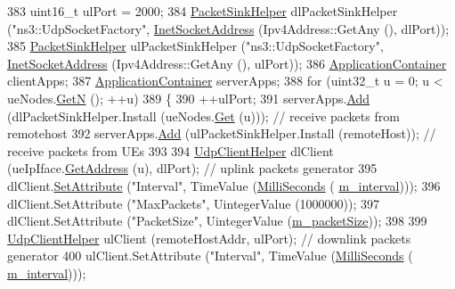 \begin{DoxyCode}
383   uint16\_t ulPort = 2000;
384   \hyperlink{classns3_1_1PacketSinkHelper}{PacketSinkHelper} dlPacketSinkHelper (\textcolor{stringliteral}{"ns3::UdpSocketFactory"}, 
      \hyperlink{classns3_1_1InetSocketAddress}{InetSocketAddress} (Ipv4Address::GetAny (), dlPort));
385   \hyperlink{classns3_1_1PacketSinkHelper}{PacketSinkHelper} ulPacketSinkHelper (\textcolor{stringliteral}{"ns3::UdpSocketFactory"}, 
      \hyperlink{classns3_1_1InetSocketAddress}{InetSocketAddress} (Ipv4Address::GetAny (), ulPort));
386   \hyperlink{classns3_1_1ApplicationContainer}{ApplicationContainer} clientApps;
387   \hyperlink{classns3_1_1ApplicationContainer}{ApplicationContainer} serverApps;
388   \textcolor{keywordflow}{for} (uint32\_t u = 0; u < ueNodes.\hyperlink{classns3_1_1NodeContainer_aed647ac56d0407a7706aba02eb44b951}{GetN} (); ++u)
389     \{
390       ++ulPort;
391       serverApps.\hyperlink{classns3_1_1ApplicationContainer_ad09ab1a1ad5849d518d5f4c262e38152}{Add} (dlPacketSinkHelper.Install (ueNodes.\hyperlink{classns3_1_1NodeContainer_a9ed96e2ecc22e0f5a3d4842eb9bf90bf}{Get} (u))); \textcolor{comment}{// receive packets from
       remotehost}
392       serverApps.\hyperlink{classns3_1_1ApplicationContainer_ad09ab1a1ad5849d518d5f4c262e38152}{Add} (ulPacketSinkHelper.Install (remoteHost));  \textcolor{comment}{// receive packets from UEs}
393 
394       \hyperlink{classns3_1_1UdpClientHelper}{UdpClientHelper} dlClient (ueIpIface.\hyperlink{classns3_1_1Ipv4InterfaceContainer_ae63208dcd222be986822937ee4aa828c}{GetAddress} (u), dlPort); \textcolor{comment}{// uplink
       packets generator}
395       dlClient.\hyperlink{classns3_1_1UdpClientHelper_a8bbae16a28f85ab3f3b5aa4642edfeae}{SetAttribute} (\textcolor{stringliteral}{"Interval"}, TimeValue (\hyperlink{group__timecivil_gaf26127cf4571146b83a92ee18679c7a9}{MilliSeconds} (
      \hyperlink{classLenaFdTbfqFfMacSchedulerTestCase1_adad6e1394f49a6309d50cb371c35266d}{m\_interval})));
396       dlClient.SetAttribute (\textcolor{stringliteral}{"MaxPackets"}, UintegerValue (1000000));
397       dlClient.SetAttribute (\textcolor{stringliteral}{"PacketSize"}, UintegerValue (\hyperlink{classLenaFdTbfqFfMacSchedulerTestCase1_abedc52d80c1ae946b3aba4f061b8bb2f}{m\_packetSize}));
398 
399       \hyperlink{classns3_1_1UdpClientHelper}{UdpClientHelper} ulClient (remoteHostAddr, ulPort);           \textcolor{comment}{// downlink packets
       generator}
400       ulClient.SetAttribute (\textcolor{stringliteral}{"Interval"}, TimeValue (\hyperlink{group__timecivil_gaf26127cf4571146b83a92ee18679c7a9}{MilliSeconds} (
      \hyperlink{classLenaFdTbfqFfMacSchedulerTestCase1_adad6e1394f49a6309d50cb371c35266d}{m\_interval})));

\end{DoxyCode}
